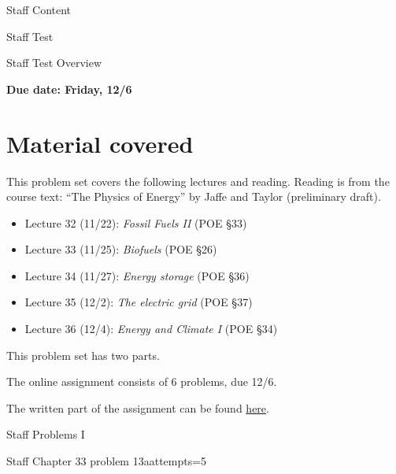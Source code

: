 {%

\begin{edXchapter}{Staff Content}

\begin{edXsection}{Staff Test}

\begin{edXtext}{Staff Test Overview}


{\bf Due date: Friday, 12/6}

\section{Material covered}

This problem set covers the following lectures and reading.  Reading
is from the course text: ``The Physics of Energy'' by Jaffe and Taylor
(preliminary draft).

\begin{itemize}
\item Lecture 32 (11/22):  {\sl Fossil Fuels II}
   (POE  \S 33)
\item Lecture 33 (11/25):  {\sl  Biofuels}
   (POE  \S 26)
\item Lecture 34 (11/27):  {\sl Energy storage}
   (POE  \S 36)
\item Lecture 35 (12/2):  {\sl The electric grid}
   (POE  \S 37)
\item Lecture 36 (12/4):  {\sl Energy and Climate I}
   (POE  \S 34)
\end{itemize}

This problem set has two parts.

The online assignment consists of 6 problems, due 12/6.
 
The written part of the assignment can be found \href{http://physicsofenergy.mit.edu/students/problems.php}{here}.

\end{edXtext}

\end{edXsection}



\begin{edXsection}{Staff Problems I}

\begin{edXvertical}

\begin{edXproblem}{Staff Chapter 33 problem 13a}{attempts=5}


\end{edXproblem}
\end{edXvertical}
\end{edXsection}
\end{edXchapter}}
